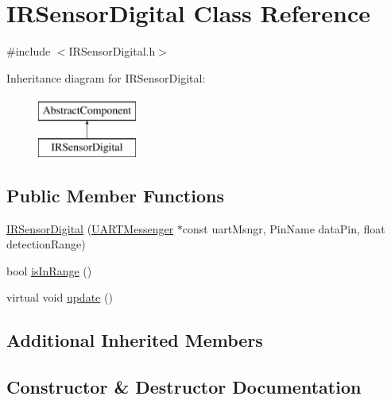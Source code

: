\hypertarget{class_i_r_sensor_digital}{}\section{I\+R\+Sensor\+Digital Class Reference}
\label{class_i_r_sensor_digital}


{\ttfamily \#include $<$I\+R\+Sensor\+Digital.\+h$>$}

Inheritance diagram for I\+R\+Sensor\+Digital\+:\begin{figure}[H]
\begin{center}
\leavevmode
\includegraphics[height=2.000000cm]{class_i_r_sensor_digital}
\end{center}
\end{figure}
\subsection*{Public Member Functions}
\begin{DoxyCompactItemize}
\item 
\hyperlink{class_i_r_sensor_digital_a43d7d836d07616260611d3cef709dff1}{I\+R\+Sensor\+Digital} (\hyperlink{class_u_a_r_t_messenger}{U\+A\+R\+T\+Messenger} $\ast$const uart\+Msngr, Pin\+Name data\+Pin, float detection\+Range)
\item 
bool \hyperlink{class_i_r_sensor_digital_a749b91dae3e83900f6de49fcc908470d}{is\+In\+Range} ()
\item 
virtual void \hyperlink{class_i_r_sensor_digital_a8d09a546a1f4b4c6533c324d98a146a9}{update} ()
\end{DoxyCompactItemize}
\subsection*{Additional Inherited Members}


\subsection{Constructor \& Destructor Documentation}
\mbox{\label{class_i_r_sensor_digital_a43d7d836d07616260611d3cef709dff1}} 
